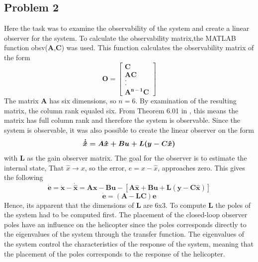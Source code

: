\subsection{Problem 2}
Here the task was to examine the observability of the system and create a linear observer for the system. 
To calculate the observability matrix,the MATLAB function obsv(\textbf{A},\textbf{C}) was used. This function calculates the observability matrix of the form 
    \begin{equation}
        \textbf{O} = \begin{bmatrix}
            \boldsymbol{C}\\
            \boldsymbol{AC}\\
             .\\
             .\\
         \boldsymbol{A^{n-1}C}
    \end{bmatrix}
    \end{equation}\label{eq:obsv}
The matrix \textbf{A} has six dimensions, so $n = 6$. By examination of the resulting matrix, the column rank equaled six. From Theorem 6.01 in \cite{syllabus}, this means the matrix has full column rank and therefore the system is observable. 
\newline
Since the system is observable, it was also possible to create the linear observer on the form 
    \begin{equation}\label{eq:state-estimator}
        \boldsymbol{\dot{\hat{x}} = A\hat{x} + Bu + L(y-C\hat{x})}\\
    \end{equation}
with \textbf{L} as the gain observer matrix. The goal for the observer is to estimate the internal state, That $\hat{x} \rightarrow x$, so the error, $e = x - \hat{x}$, approaches zero. This gives the following
    \begin{equation*}
        \boldsymbol{\dot{e} = \dot{x} - \dot{\hat{x}}} = \boldsymbol{Ax - Bu - [A\hat{x} + Bu + L(y-C\hat{x})]}
    \end{equation*}
    \begin{equation}
        \boldsymbol{\dot{e} = (A - LC)e}
    \end{equation}
Hence, its apparent that the dimensions of \textbf{L} are 6x3. To compute \textbf{L} the poles of the system had to be computed first. 
\newline
\newline
The placement of the closed-loop observer poles have an influence on the helicopter since the poles corresponds directly to the eigenvalues of the system through the transfer function. The eigenvalues of the system control the characteristics of the response of the system, meaning that the placement of the poles corresponds to the response of the helicopter.
